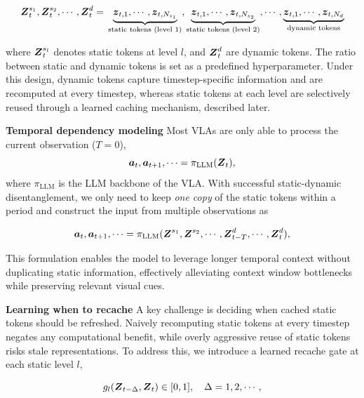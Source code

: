 \begin{equation}
\boldsymbol{Z}^{s_1}_t, \boldsymbol{Z}^{s_2}_t, \cdots, \boldsymbol{Z}^d_t = \\
  \underbrace{\boldsymbol{z}_{t,1}, \cdots, \boldsymbol{z}_{t,N_{s_1}}}_\text{static tokens (level 1)}, \underbrace{\boldsymbol{z}_{t,1}, \cdots, \boldsymbol{z}_{t,N_{s_2}}}_\text{static tokens (level 2)}, \cdots, \underbrace{\boldsymbol{z}_{t,1}, \cdots, \boldsymbol{z}_{t, N_d}}_\text{dynamic tokens}
\end{equation}

where $\boldsymbol{Z}^{s_l}_t$ denotes static tokens at level $l$, and $\boldsymbol{Z}^{d}_t$ are dynamic tokens. The ratio between static and dynamic tokens is set as a predefined hyperparameter. Under this design, dynamic tokens capture timestep-specific information and are recomputed at every timestep, whereas static tokens at each level are selectively reused through a learned caching mechanism, described later.

\noindent\textbf{Temporal dependency modeling}
Most VLAs \citep{kim2024openvla,li2024cogact,qu2025spatialvla} are only able to process the current observation ($T=0$),
\begin{equation}
    \boldsymbol{a}_t, \boldsymbol{a}_{t+1}, \cdots = \pi_\text{LLM}(\boldsymbol{Z}_t),
\end{equation}
where $\pi_\text{LLM}$ is the LLM backbone of the VLA.
With successful static-dynamic disentanglement, we only need to keep \emph{one copy} of the static tokens within a period and construct the input from multiple observations as

\begin{equation}
    \boldsymbol{a}_t, \boldsymbol{a}_{t+1}, \cdots = \pi_\text{LLM}(\boldsymbol{Z}^{s_1}, \boldsymbol{Z}^{s_2}, \cdots,\boldsymbol{Z}^d_{t-T}, \cdots, \boldsymbol{Z}^d_t),
\end{equation}

This formulation enables the model to leverage longer temporal context without duplicating static information, effectively alleviating context window bottlenecks while preserving relevant visual cues.

\noindent\textbf{Learning when to recache}
A key challenge is deciding when cached static tokens should be refreshed. Naively recomputing static tokens at every timestep negates any computational benefit, while overly aggressive reuse of static tokens risks stale representations. To address this, we introduce a learned recache gate at each static level $l$,

\begin{equation}
    g_l(\boldsymbol{Z}_{t-\Delta}, \boldsymbol{Z}_t) \in [0, 1],\quad \Delta=1,2,\cdots, 
\end{equation}

